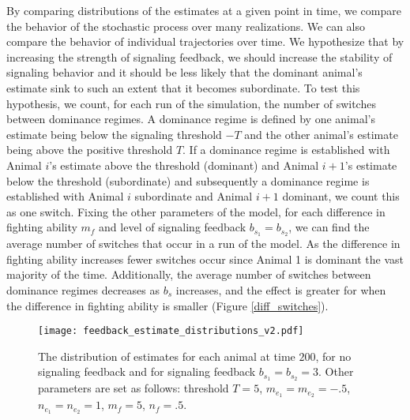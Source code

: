 \documentclass{article}
\begin{document}
By comparing distributions of the estimates at a given point in time, we compare the behavior of the stochastic process over many realizations.  We can also compare the behavior of individual trajectories over time.  We hypothesize that by increasing the strength of signaling feedback, we should increase the stability of signaling behavior and it should be less likely that the dominant animal's estimate sink to such an extent that it becomes subordinate.  To test this hypothesis, we count, for each run of the simulation, the number of switches between dominance regimes.  A dominance regime is defined by one animal's estimate being below the signaling threshold $-T$ and the other animal's estimate being above the positive threshold $T$.  If a dominance regime is established with Animal $i$'s estimate above the threshold (dominant) and Animal $i+1$'s estimate below the threshold (subordinate) and subsequently a dominance regime is established with Animal $i$ subordinate and Animal $i+1$ dominant, we count this as one switch.  Fixing the other parameters of the model, for each difference in fighting ability $m_f$ and level of signaling feedback $b_{s_1}=b_{s_2}$, we can find the average number of switches that occur in a run of the model.  As the difference in fighting ability increases fewer switches occur since Animal 1 is dominant the vast majority of the time.  Additionally, the average number of switches between dominance regimes decreases as $b_{s}$ increases, and the effect is greater for when the difference in fighting ability is smaller (Figure \ref{diff_switches}).
  
\begin{figure}
\begin{center}
\texttt{[image: feedback\_estimate\_distributions\_v2.pdf]}
\end{center}
\caption{\label{diff_dists} The distribution of estimates for each animal at time $200$, for no signaling feedback and for signaling feedback $b_{s_1}=b_{s_2}=3$.  Other parameters are set as follows: threshold $T=5$, $m_{e_1}=m_{e_2}=-.5$, $n_{e_1}=n_{e_2}=1$, $m_f=5$, $n_f=.5$. }
\end{figure}
\end{document}
